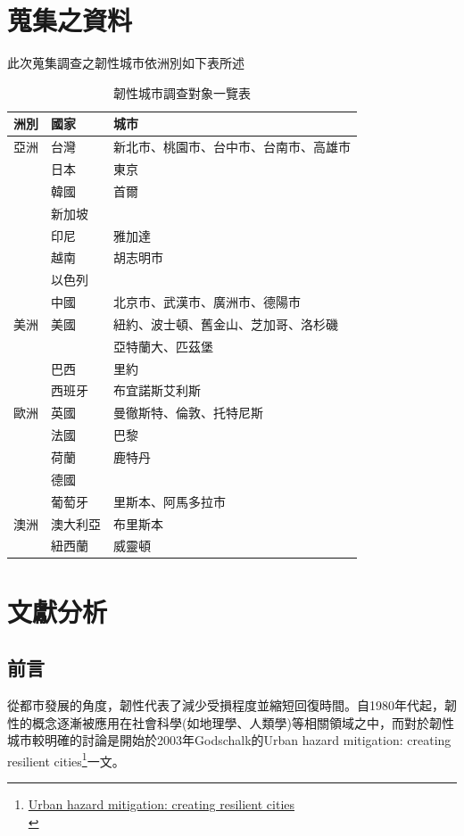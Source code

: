 \documentclass[a4paper,12pt]{article}
\begin{document}
\section{蒐集之資料}
\label{sec:org5c5c6de}
此次蒐集調查之韌性城市依洲別如下表所述\\
\begin{table}[htbp]
\caption{\label{table2}韌性城市調查對象一覽表}
\centering
\begin{tabular}{lll}
\hline
洲別 & 國家 & 城市\\
\hline
亞洲 & 台灣 & 新北市、桃園市、台中市、台南市、高雄市\\
 & 日本 & 東京\\
 & 韓國 & 首爾\\
 & 新加坡 & \\
 & 印尼 & 雅加達\\
 & 越南 & 胡志明市\\
 & 以色列 & \\
 & 中國 & 北京市、武漢市、廣洲市、德陽市\\
\hline
美洲 & 美國 & 紐約、波士頓、舊金山、芝加哥、洛杉磯\\
 &  & 亞特蘭大、匹茲堡\\
 & 巴西 & 里約\\
 & 西班牙 & 布宜諾斯艾利斯\\
\hline
歐洲 & 英國 & 曼徹斯特、倫敦、托特尼斯\\
 & 法國 & 巴黎\\
 & 荷蘭 & 鹿特丹\\
 & 德國 & \\
 & 葡萄牙 & 里斯本、阿馬多拉市\\
\hline
澳洲 & 澳大利亞 & 布里斯本\\
 & 紐西蘭 & 威靈頓\\
\hline
\end{tabular}
\end{table}
\newpage

\section{文獻分析}
\label{sec:orga9e9289}

\subsection{前言}
\label{sec:org46a30ab}

從都市發展的角度，韌性代表了減少受損程度並縮短回復時間。自1980年代起，韌性的概念逐漸被應用在社會科學(如地理學、人類學)等相關領域之中，而對於韌性城市較明確的討論是開始於2003年Godschalk的Urban hazard mitigation: creating resilient cities\footnote{\href{https://www.google.com/url?sa=t\&rct=j\&q=\&esrc=s\&source=web\&cd=\&ved=2ahUKEwjRxsnV27HvAhVzNKYKHSaxDwIQFjADegQIBhAD\&url=https\%3A\%2F\%2Fweb.ntpu.edu.tw\%2F\~slchan\%2Ffile\_old\%2F1\_6.pdf\&usg=AOvVaw1s7kZBhbLaYSAx6XBRwm7P}{Urban hazard mitigation: creating resilient cities}\\}一文。\\
\end{document}
